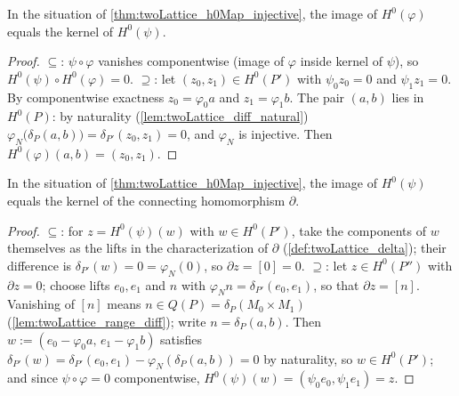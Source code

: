 \begin{theorem}
  \label{thm:twoLattice_exact_h0_middle}
  \leanok
  In the situation of \ref{thm:twoLattice_h0Map_injective}, the image of
  \(H^0(\varphi)\) equals the kernel of \(H^0(\psi)\).
\end{theorem}
\begin{proof}
  \leanok
  \(\subseteq\): \(\psi \circ \varphi\) vanishes componentwise (image of \(\varphi\)
  inside kernel of \(\psi\)), so \(H^0(\psi) \circ H^0(\varphi) = 0\).
  \(\supseteq\): let \((z_0, z_1) \in H^0(P')\) with \(\psi_0 z_0 = 0\) and
  \(\psi_1 z_1 = 0\). By componentwise exactness \(z_0 = \varphi_0 a\) and
  \(z_1 = \varphi_1 b\). The pair \((a, b)\) lies in \(H^0(P)\): by naturality
  (\ref{lem:twoLattice_diff_natural})
  \(\varphi_N\bigl(\delta_P(a,b)\bigr) = \delta_{P'}(z_0, z_1) = 0\), and
  \(\varphi_N\) is injective. Then \(H^0(\varphi)(a, b) = (z_0, z_1)\).
\end{proof}

\begin{theorem}
  \label{thm:twoLattice_exact_h0_delta}
  \leanok
  In the situation of \ref{thm:twoLattice_h0Map_injective}, the image of
  \(H^0(\psi)\) equals the kernel of the connecting homomorphism \(\partial\).
\end{theorem}
\begin{proof}
  \leanok
  \(\subseteq\): for \(z = H^0(\psi)(w)\) with \(w \in H^0(P')\), take the components
  of \(w\) themselves as the lifts in the characterization of \(\partial\)
  (\ref{def:twoLattice_delta}); their difference is \(\delta_{P'}(w) = 0 =
  \varphi_N(0)\), so \(\partial z = [0] = 0\).
  \(\supseteq\): let \(z \in H^0(P'')\) with \(\partial z = 0\); choose lifts
  \(e_0, e_1\) and \(n\) with \(\varphi_N n = \delta_{P'}(e_0, e_1)\), so that
  \(\partial z = [n]\). Vanishing of \([n]\) means \(n \in Q(P) =
  \delta_P(M_0 \times M_1)\) (\ref{lem:twoLattice_range_diff}); write
  \(n = \delta_P(a, b)\). Then \(w := (e_0 - \varphi_0 a,\, e_1 - \varphi_1 b)\)
  satisfies
  \(\delta_{P'}(w) = \delta_{P'}(e_0,e_1) - \varphi_N(\delta_P(a,b)) = 0\)
  by naturality, so \(w \in H^0(P')\); and since \(\psi\circ\varphi = 0\)
  componentwise, \(H^0(\psi)(w) = (\psi_0 e_0, \psi_1 e_1) = z\).
\end{proof}

